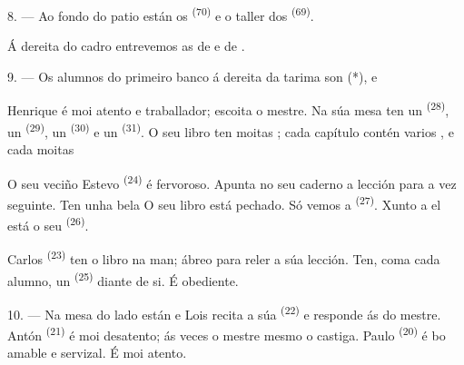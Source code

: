 8. --- Ao fondo do patio están os 
\textsuperscript{(70)} e o taller dos 
\textsuperscript{(69)}.

Á dereita do cadro entrevemos as  de  e de
.


\VUsaut{2.4mm}

\VUsaut{3.0mm}

9. --- Os alumnos do primeiro banco á dereita da tarima son  (*),
 e 

Henrique é moi atento e traballador; escoita o mestre. Na súa mesa ten un
 \textsuperscript{(28)}, un  \textsuperscript{(29)}, un
 \textsuperscript{(30)} e un 
\textsuperscript{(31)}. O seu libro ten moitas ; cada capítulo contén
varios , e cada  moitas 

O seu veciño Estevo \textsuperscript{(24)} é fervoroso. Apunta no seu caderno a
lección para a vez seguinte. Ten unha bela  O seu libro está pechado.
Só vemos a  \textsuperscript{(27)}. Xunto a el está o seu
 \textsuperscript{(26)}.

Carlos \textsuperscript{(23)} ten o libro na man; ábreo para reler a súa lección.
Ten, coma cada alumno, un  \textsuperscript{(25)} diante de si. É
obediente.

10. --- Na mesa do lado están  e  Lois recita a
súa  \textsuperscript{(22)} e responde ás  do
mestre. Antón \textsuperscript{(21)} é moi desatento; ás veces o mestre mesmo o
castiga. Paulo \textsuperscript{(20)} é bo  amable e servizal. É
moi atento.

